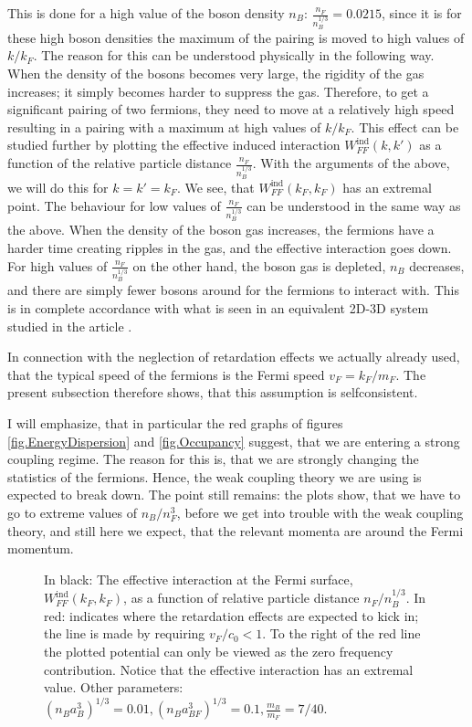 This is done for a high value of the boson density $n_B$: $\frac{n_F}{n_B^{1/3}} = 0.0215$, since it is for these high boson densities the maximum of the pairing is moved to high values of $k/k_F$. The reason for this can be understood physically in the following way. When the density of the bosons becomes very large, the rigidity of the gas increases; it simply becomes harder to suppress the gas. Therefore, to get a significant pairing of two fermions, they need to move at a relatively high speed resulting in a pairing with a maximum at high values of $k/k_F$. This effect can be studied further by plotting the effective induced interaction $W_{FF}^{\text{ind}}(k,k')$ as a function of the relative particle distance $\frac{n_F}{n_B^{1/3}}$. With the arguments of the above, we will do this for $k = k' = k_F$. We see, that $W_{FF}^{\text{ind}}(k_F,k_F)$ has an extremal point. The behaviour for low values of $\frac{n_F}{n_B^{1/3}}$ can be understood in the same way as the above. When the density of the boson gas increases, the fermions have a harder time creating ripples in the gas, and the effective interaction goes down. For high values of $\frac{n_F}{n_B^{1/3}}$ on the other hand, the boson gas is depleted, $n_B$ decreases, and there are simply fewer bosons around for the fermions to interact with. This is in complete accordance with what is seen in an equivalent 2D-3D system studied in the article \cite{BruunZhigangTopSuperfluid}. 

In connection with the neglection of retardation effects we actually already used, that the typical speed of the fermions is the Fermi speed $v_F = k_F/m_F$. The present subsection therefore shows, that this assumption is selfconsistent. 

I will emphasize, that in particular the red graphs of figures \ref{fig.EnergyDispersion} and \ref{fig.Occupancy} suggest, that we are entering a strong coupling regime. The reason for this is, that we are strongly changing the statistics of the fermions. Hence, the weak coupling theory we are using is expected to break down. The point still remains: the plots show, that we have to go to extreme values of $n_B/n_F^3$, before we get into trouble with the weak coupling theory, and still here we expect, that the relevant momenta are around the Fermi momentum. 

\begin{figure} 
\begin{center}  
  
\caption{In black: The effective interaction at the Fermi surface, $W_{FF}^\text{ind}(k_F,k_F)$, as a function of relative particle distance $n_F/n_B^{1/3}$. In red: indicates where the retardation effects are expected to kick in; the line is made by requiring $v_F/c_0 < 1$. To the right of the red line the plotted potential can only be viewed as the zero frequency contribution. Notice that the effective interaction has an extremal value. Other parameters: $(n_Ba_B^3)^{1/3} = 0.01, (n_Ba_{BF}^3)^{1/3} = 0.1, \frac{m_B}{m_F} = 7/40.$}  
\label{fig.maxkDeltakaBdepend}  
\end{center}    
\end{figure}

